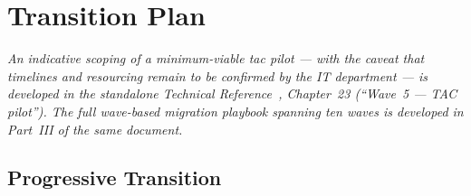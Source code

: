 \section{Transition Plan}
\label{sec:transition}

\noindent
\emph{An indicative scoping of a minimum-viable \gls{tac} pilot ---
with the caveat that timelines and resourcing remain to be confirmed
by the IT department --- is developed in the standalone Technical
Reference~\cite{ng-tech-ref-2026}, Chapter~23 (``Wave~5 --- TAC
pilot''). The full wave-based migration playbook spanning ten waves
is developed in Part~III of the same document.}

\subsection{Progressive Transition}

